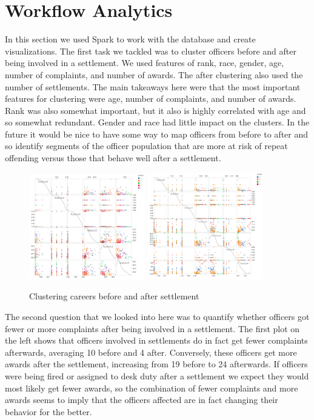 \documentclass[11pt]{article}
\begin{document}
\FloatBarrier
\section{Workflow Analytics}

In this section we used Spark to work with the database and create visualizations. The first task we tackled was to cluster officers before and after being involved in a settlement. We used features of rank, race, gender, age, number of complaints, and number of awards. The after clustering also used the number of settlements. The main takeaways here were that the most important features for clustering were age, number of complaints, and number of awards. Rank was also somewhat important, but it also is highly correlated with age and so somewhat redundant. Gender and race had little impact on the clusters. In the future it would be nice to have some way to map officers from before to after and so identify segments of the officer population that are more at risk of repeat offending versus those that behave well after a settlement.

\begin{figure}[h!]
\centering
\caption{Clustering careers before and after settlement}
\includegraphics[width=0.45\textwidth]{cluster.png}
\includegraphics[width=0.45\textwidth]{cluster2.png}
\end{figure}

The second question that we looked into here was to quantify whether officers got fewer or more complaints after being involved in a settlement. The first plot on the left shows that officers involved in settlements do in fact get fewer complaints afterwards, averaging 10 before and 4 after. Conversely, these officers get more awards after the settlement, increasing from 19 before to 24 afterwards. If officers were being fired or assigned to desk duty after a settlement we expect they would most likely get fewer awards, so the combination of fewer complaints and more awards seems to imply that the officers affected are in fact changing their behavior for the better.
\end{document}
